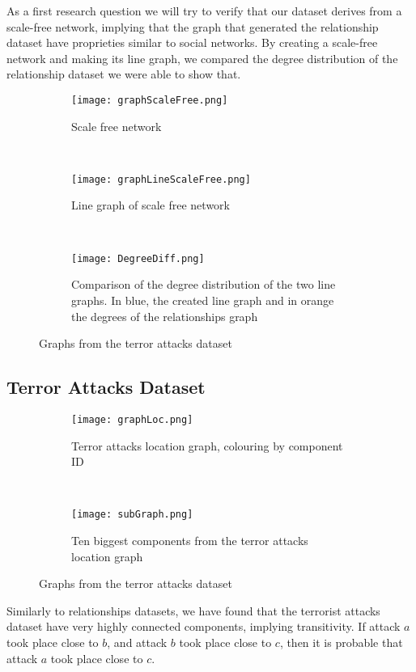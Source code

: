 As a first research question we will try to verify that our dataset derives from a scale-free network, implying that the graph that generated the relationship dataset have proprieties similar to social networks.
By creating a scale-free network and making its line graph, we compared the degree distribution of the relationship dataset we were able to show that.

\begin{figure}[H]
\begin{center}
    \begin{subfigure}[b]{0.30\textwidth}
        \texttt{[image: graphScaleFree.png]}
        \caption{Scale free network}
        \label{fig:Scalefree}
    \end{subfigure}
    ~
    \begin{subfigure}[b]{0.30\textwidth}
        \texttt{[image: graphLineScaleFree.png]}
        \caption{Line graph of scale free network}
        \label{fig:lineG}
    \end{subfigure}
    ~
    \begin{subfigure}[b]{0.30\textwidth}
        \texttt{[image: DegreeDiff.png]}
        \caption{Comparison of the degree distribution of the two line graphs. In blue, the created line graph and in orange the degrees of the relationships graph}
        \label{fig:DegDiff}
    \end{subfigure}
\caption{Graphs from the terror attacks dataset}
\label{fig:RelationshipScaleFree}
\end{center}
\end{figure}


\subsection{Terror Attacks Dataset}
\label{subsec:Terror Attacks Dataset}

\begin{figure}[H]
\begin{center}
    \begin{subfigure}[b]{0.45\textwidth}
        \texttt{[image: graphLoc.png]}
        \caption{Terror attacks location graph, colouring by component ID}
        \label{fig:graphLoc}
    \end{subfigure}
    ~
    \begin{subfigure}[b]{0.45\textwidth}
        \texttt{[image: subGraph.png]}
        \caption{Ten biggest components from the terror attacks location graph}
        \label{fig:subGraph}
    \end{subfigure}
\caption{Graphs from the terror attacks dataset}
\label{fig:graphPlots}
\end{center}
\end{figure}

Similarly to relationships datasets, we have found that the terrorist attacks dataset have very highly connected components, implying transitivity. 
If attack $a$ took place close to $b$, and attack $b$ took place close to $c$, then it is probable that attack $a$ took place close to $c$.

